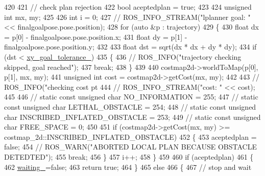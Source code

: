 \begin{DoxyCode}
{420 
421     \textcolor{comment}{// check plan rejection}
422     \textcolor{keywordtype}{bool} aceptedplan = \textcolor{keyword}{true};
423 
424     \textcolor{keywordtype}{unsigned} \textcolor{keywordtype}{int} mx, my;
425 
426     \textcolor{keywordtype}{int} i = 0;
427     \textcolor{comment}{// ROS\_INFO\_STREAM("lplanner goal: " << finalgoalpose.pose.position);}
428     \textcolor{keywordflow}{for} (\textcolor{keyword}{auto} &p : trajectory)
429     \{
430         \textcolor{keywordtype}{float} dx = p[0] - finalgoalpose.pose.position.x;
431         \textcolor{keywordtype}{float} dy = p[1] - finalgoalpose.pose.position.y;
432 
433         \textcolor{keywordtype}{float} dst = sqrt(dx * dx + dy * dy);
434         \textcolor{keywordflow}{if} (dst < \hyperlink{classcl__move__base__z_1_1forward__local__planner_1_1ForwardLocalPlanner_acd2ed91ee166f03faeeb9d6a4b91084b}{xy\_goal\_tolerance\_})
435          \{
436             \textcolor{comment}{//  ROS\_INFO("trajectory checking skipped, goal reached");}
437              \textcolor{keywordflow}{break};
438         \}
439 
440         costmap2d->worldToMap(p[0], p[1], mx, my);
441         \textcolor{keywordtype}{unsigned} \textcolor{keywordtype}{int} cost = costmap2d->getCost(mx, my);
442 
443         \textcolor{comment}{// ROS\_INFO("checking cost pt %
444         \textcolor{comment}{// ROS\_INFO\_STREAM("cost: " << cost);}
445 
446         \textcolor{comment}{// static const unsigned char NO\_INFORMATION = 255;}
447         \textcolor{comment}{// static const unsigned char LETHAL\_OBSTACLE = 254;}
448         \textcolor{comment}{// static const unsigned char INSCRIBED\_INFLATED\_OBSTACLE = 253;}
449         \textcolor{comment}{// static const unsigned char FREE\_SPACE = 0;}
450 
451         \textcolor{keywordflow}{if} (costmap2d->getCost(mx, my) >= costmap\_2d::INSCRIBED\_INFLATED\_OBSTACLE)
452         \{
453             aceptedplan = \textcolor{keyword}{false};
454             \textcolor{comment}{// ROS\_WARN("ABORTED LOCAL PLAN BECAUSE OBSTACLE DETEDTED");}
455             \textcolor{keywordflow}{break};
456         \}
457         i++;
458     \}
459 
460     \textcolor{keywordflow}{if} (aceptedplan)
461     \{
462         \hyperlink{classcl__move__base__z_1_1forward__local__planner_1_1ForwardLocalPlanner_a5061c2aa0d8d2309f1669e402741f0fa}{waiting\_}=\textcolor{keyword}{false};
463         \textcolor{keywordflow}{return} \textcolor{keyword}{true};
464     \}
465     \textcolor{keywordflow}{else}
466     \{
467         \textcolor{comment}{// stop and wait}
}}
\end{DoxyCode}
